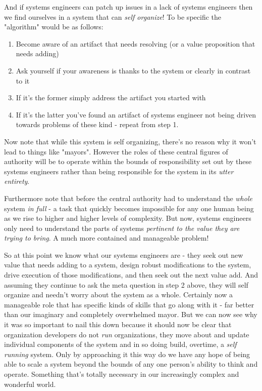 \documentclass[11pt,a5paper]{book}
\begin{document}
And if systems engineers can patch up issues in a lack of systems engineers then we find ourselves in a system that can \textit{self organize}! To be specific the "algorithm" would be as follows:

\begin{enumerate}
\item Become aware of an artifact that needs resolving (or a value proposition that needs adding)
\item Ask yourself if your awareness is thanks to the system or clearly in contrast to it
\item If it's the former simply address the artifact you started with
\item If it's the latter you've found an artifact of systems engineer not being driven towards problems of these kind - repeat from step 1.
\end{enumerate}

Now note that while this system is self organizing, there's no reason why it won't lead to things like "mayors". However the roles of these central figures of authority will be to operate within the bounds of responsibility set out by these systems engineers rather than being responsible for the system in its \textit{utter entirety}.
\newline

Furthermore note that before the central authority had to understand the \textit{whole} system \textit{in full} - a task that quickly becomes impossible for any one human being as we rise to higher and higher levels of complexity. But now, systems engineers only need to understand the parts of systems \textit{pertinent to the value they are trying to bring}. A much more contained and manageable problem!
\newline 

So at this point we know what our systems engineers are - they seek out new value that needs adding to a system, design robust modifications to the system, drive execution of those modifications, and then seek out the next value add. And assuming they continue to ask the meta question in step 2 above, they will self organize and needn't worry about the system as a whole. Certainly now a manageable role that has specific kinds of skills that go along with it - far better than our imaginary and completely overwhelmed mayor. But we can now see why it was so important to nail this down because it should now be clear that organization developers do not \textit{run} organizations, they move about and update individual components of the system and in so doing build, overtime, a \textit{self running} system. Only by approaching it this way do we have any hope of being able to scale a system beyond the bounds of any one person's ability to think and operate. Something that's totally necessary in our increasingly complex and wonderful world. 
\end{document}
